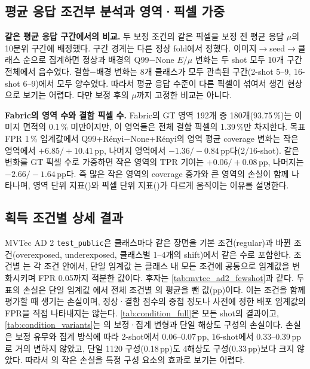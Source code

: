 \subsection{평균 응답 조건부 분석과 영역·픽셀 가중}
\label{sec:appendix:conditional-mechanism}

\noindent\textbf{같은 평균 응답 구간에서의 비교.}
두 보정 조건의 같은 픽셀을 보정 전 평균 응답 $\mu$의 10분위 구간에 배정했다. 구간 경계는 다른 정상 fold에서 정했다.
이미지$\rightarrow$seed$\rightarrow$클래스 순으로 집계하면 정상과 배경의 Q99$-$None $E/\mu$ 변화는 두 shot 모두 10개 구간 전체에서 음수였다.
결함$-$배경 변화는 8개 클래스가 모두 관측된 구간(2-shot 5--9, 16-shot 6--9)에서 모두 양수였다.
따라서 평균 응답 수준이 다른 픽셀이 섞여서 생긴 현상으로 보기는 어렵다. 다만 보정 후의 $\mu$까지 고정한 비교는 아니다.

\noindent\textbf{Fabric의 영역 수와 결함 픽셀 수.}
Fabric의 GT 영역 192개 중 180개(93.75\,\%)는 이미지 면적의 0.1\,\% 미만이지만, 이 영역들은 전체 결함 픽셀의 1.39\,\%만 차지한다.
목표 FPR 1\,\% 임계값에서 Q99+Rényi$-$None+Rényi의 영역 평균 coverage 변화는 작은 영역에서 $+6.85/+10.41$\,pp, 나머지 영역에서 $-1.36/-0.84$\,pp다(2/16-shot).
같은 변화를 GT 픽셀 수로 가중하면 작은 영역의 TPR 기여는 $+0.06/+0.08$\,pp, 나머지는 $-2.66/-1.64$\,pp다.
즉 많은 작은 영역의 coverage 증가와 큰 영역의 손실이 함께 나타나며, 영역 단위 지표(\AUPRO)와 픽셀 단위 지표(\pAUROC)가 다르게 움직이는 이유를 설명한다.

\FloatBarrier
\subsection{획득 조건별 상세 결과}
\label{sec:appendix:condition}

MVTec AD 2 \texttt{test\_public}은 클래스마다 같은 장면을 기본 조건(regular)과 바뀐 조건(overexposed, underexposed, 클래스별 1--4개의 shift)에서 같은 수로 포함한다.
조건별 \AUPRO{}는 각 조건 안에서, 단일 임계값 \AUPRO{}는 클래스 내 모든 조건에 공통으로 임계값을 변화시키며 FPR 0.05까지 적분한 값이다. 후자는 \cref{tab:mvtec_ad2_fewshot}과 같다.
두 표의 손실은 단일 임계값 \AUPRO{}에서 전체 조건별 \AUPRO{}의 평균을 뺀 값(pp)이다. 이는 조건을 함께 평가할 때 생기는 손실이며, 정상·결함 점수의 중첩 정도나 사전에 정한 배포 임계값의 FPR을 직접 나타내지는 않는다.
\cref{tab:condition_full}은 모든 shot의 결과이고, \cref{tab:condition_variants}는 \method{}의 보정·집계 변형과 단일 해상도 구성의 손실이다.
손실은 보정 유무와 집계 방식에 따라 2-shot에서 0.06--0.07\,pp, 16-shot에서 0.33--0.39\,pp로 거의 변하지 않았고, 단일 1120 구성(0.18\,pp)도 4해상도 구성(0.33\,pp)보다 크지 않았다.
따라서 \method{}의 작은 손실을 특정 구성 요소의 효과로 보기는 어렵다.

